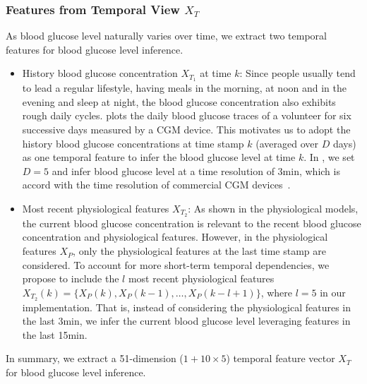 \subsubsection{Features from Temporal View $X_T$}
As blood glucose level naturally varies over time, we extract two temporal features for blood glucose level inference.
\begin{itemize}
  \item
  History blood glucose concentration $X_{T_1}$ at time $k$:
  Since people usually tend to lead a regular lifestyle, \eg having meals in the morning, at noon and in the evening and sleep at night, the blood glucose concentration also exhibits rough daily cycles.
   plots the daily blood glucose traces of a volunteer for six successive days measured by a CGM device.
  This motivates us to adopt the history blood glucose concentrations at time stamp $k$ (averaged over $D$ days) as one temporal feature to infer the blood glucose level at time $k$.
  In \sysname, we set $D=5$ and infer blood glucose level at a time resolution of 3min, which is accord with the time resolution of commercial CGM devices~\cite{bib:CGM_wave}.
  \item
  Most recent physiological features $X_{T_2}$:
  As shown in the physiological models, the current blood glucose concentration is relevant to the recent blood glucose concentration and physiological features.
  However, in the physiological features $X_P$, only the physiological features at the last time stamp are considered.
  To account for more short-term temporal dependencies, we propose to include the $l$ most recent physiological features $X_{T_2}(k) = \{X_P(k), X_P(k-1), \ldots, X_P(k-l+1)\}$, where $l=5$ in our implementation.
  That is, instead of considering the physiological features in the last 3min, we infer the current blood glucose level leveraging features in the last 15min.
\end{itemize}
In summary, we extract a 51-dimension ($1+10\times 5$) temporal feature vector $X_T$ for blood glucose level inference.


